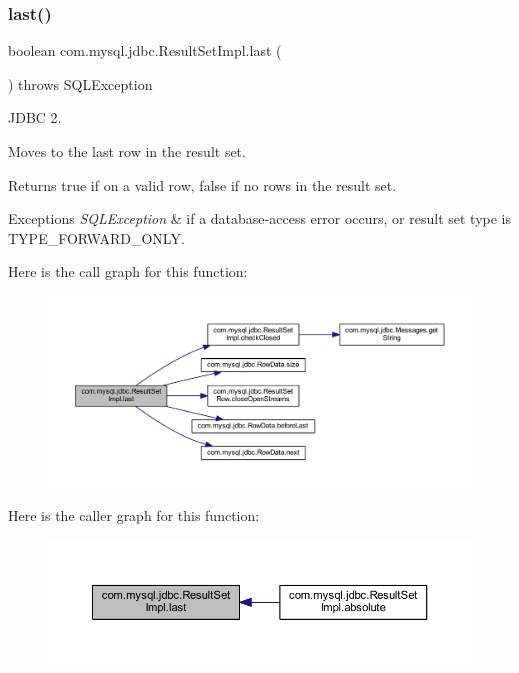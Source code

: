 \subsubsection{\texorpdfstring{last()}{last()}}
{\footnotesize\ttfamily boolean com.\+mysql.\+jdbc.\+Result\+Set\+Impl.\+last (\begin{DoxyParamCaption}{ }\end{DoxyParamCaption}) throws S\+Q\+L\+Exception}

J\+D\+BC 2.

Moves to the last row in the result set. 

\begin{DoxyReturn}{Returns}
true if on a valid row, false if no rows in the result set.
\end{DoxyReturn}

\begin{DoxyExceptions}{Exceptions}
{\em S\+Q\+L\+Exception} & if a database-\/access error occurs, or result set type is T\+Y\+P\+E\+\_\+\+F\+O\+R\+W\+A\+R\+D\+\_\+\+O\+N\+LY. \\
\hline
\end{DoxyExceptions}
Here is the call graph for this function\+:
\nopagebreak
\begin{figure}[H]
\begin{center}
\leavevmode
\includegraphics[width=350pt]{classcom_1_1mysql_1_1jdbc_1_1_result_set_impl_ab3e82ce2b3fcc531558c942e42f554c3_cgraph}
\end{center}
\end{figure}
Here is the caller graph for this function\+:
\nopagebreak
\begin{figure}[H]
\begin{center}
\leavevmode
\includegraphics[width=350pt]{classcom_1_1mysql_1_1jdbc_1_1_result_set_impl_ab3e82ce2b3fcc531558c942e42f554c3_icgraph}
\end{center}
\end{figure}
